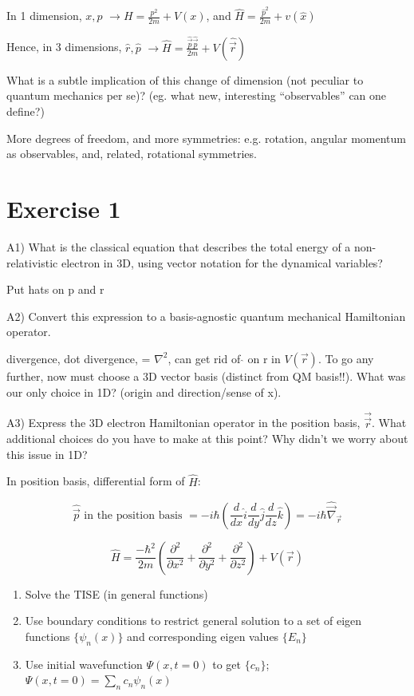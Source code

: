 \documentclass{article}
\begin{document}

In 1 dimension, $x,p$ $\longrightarrow H = \frac{p^2}{2m} + V(x)$, and $\hat{H} = \frac{\hat{p}^2}{2m} + v(\hat{x})$

Hence, in 3 dimensions, $\hat{r}, \hat{p}$ $\longrightarrow \hat{H} = \frac{\hat{\vec{p}} \hat{\vec{p}}}{2m} + V(\hat{\vec{r}})$

What is a subtle implication of this change of dimension (not peculiar to quantum mechanics per se)?  (eg. what new, interesting “observables” can one define?)

More degrees of freedom, and more symmetries: e.g. rotation, angular momentum as observables, and, related, rotational symmetries.  


\section{Exercise 1}

A1) What is the classical equation that describes the total energy of a non-relativistic electron in 3D, using vector notation for the dynamical variables?

Put hats on p and r


A2) Convert this expression to a basis-agnostic quantum mechanical Hamiltonian operator.

divergence, dot divergence, = $\nabla^2$, can get rid of $\hat{}$ on r in $V(\vec r)$.  To go any further, now must choose a 3D vector basis (distinct from QM basis!!).  What was our only choice in 1D?  (origin and direction/sense of x).

A3) Express the 3D electron Hamiltonian operator in the position basis, $\vec{\vec{r}}$.  What additional choices do you have to make at this point?  Why didn't we worry about this issue in 1D?

In position basis, differential form of $\hat{H}$:

$$\hat{\vec{p}} \text{ in the position basis } = -i \hbar \left( \frac{d}{dx} \hat{i} \frac{d}{dy} \hat{j} \frac{d}{dz} \hat{k} \right) = -i \hbar \hat{\vec{\nabla}}_{\vec{r}}$$

$$\hat{H} = \frac{-\hbar^2}{2m} \left( \frac{\partial^2}{\partial x^2} + \frac{\partial^2}{\partial y^2} + \frac{\partial^2}{\partial z^2} \right) + V(\vec{r})$$

\begin{enumerate}
    \item Solve the TISE (in general functions)
    \item Use boundary conditions to restrict general solution to a set of eigen functions $\{\psi_n(x)\}$ and corresponding eigen values $\{E_n\}$
    \item Use initial wavefunction $\Psi(x,t=0)$ to get $\{c_n\}$; $\Psi(x,t=0) = \sum_n c_n \psi_n(x)$
\end{enumerate}
\end{document}
